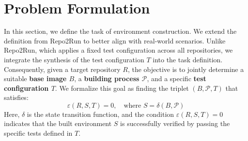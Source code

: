 \documentclass{article}
\theoremstyle{plain}
\theoremstyle{definition}
\theoremstyle{remark}
\begin{document}

\section{Problem Formulation}
In this section, we define the task of environment construction. 
We extend the definition from Repo2Run\cite{hu_repo2run_2025} to better align with real-world scenarios. 
Unlike Repo2Run, which applies a fixed test configuration across all repositories, we integrate the synthesis of the test configuration $T$ into the task definition.
Consequently, given a target repository $R$, the objective is to jointly determine a suitable \textbf{base image $B$}, a \textbf{building process $\mathcal{P}$}, and a specific \textbf{test configuration $T$}.
We formalize this goal as finding the triplet $(B, \mathcal{P}, T)$ that satisfies:
\begin{equation}
    \varepsilon(R, S, T) = 0, \quad \text{where } S = \delta(B, \mathcal{P})
    \label{eq:env_test_formulation}
\end{equation}
Here, $\delta$ is the state transition function, and the condition $\varepsilon(R, S, T) = 0$ indicates that the built environment $S$ is successfully verified by passing the specific tests defined in $T$.

\end{document}
